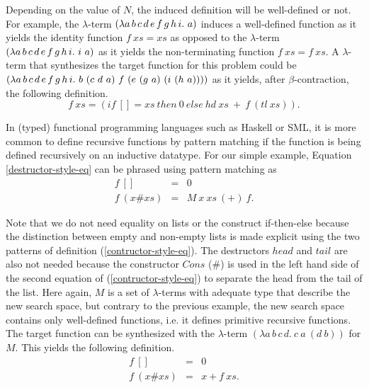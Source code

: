 Depending on the value of $N$, the induced definition will be well-defined or not. For example, the $\lambda$-term $(\lambda a\, b\, c\, \-d\,\- e\,\- f\, g\, h\, i.\ a)$ induces a well-defined function as it yields the identity function $f\ xs = xs$ as opposed to the $\lambda$-term $(\lambda a\, b\, c\, \-d\,\- e\,\- f\, g\, h\, i.\ i\ a)$ as it yields the non-terminating function $f\ xs = f\ xs$. A $\lambda$-term that synthesizes the target function for this problem could be $(\lambda a\, b\, c\, \-d\,\- e\,\- f\, g\, h\, i.\ b\ (c\ d\ a)\ f\ (e\ (g\ a)\ (i\ (h\ a))))$ as it yields, after $\beta$-contraction, the following definition.
$$
f\ xs = (if\ [] = xs\ then\ 0\ else\ hd\ xs\ +\ f\ (tl\ xs)).
$$

In (typed) functional programming languages such as Haskell or SML, it is more common to define recursive functions by pattern matching if the function is being defined recursively on an inductive datatype. For our simple example, Equation \ref{destructor-style-eq} can be phrased using pattern matching as
\begin{equation}
  \label{contructor-style-eq}
  \begin{array}{rcl}
    f\ [] & = & 0\\
    f\ (x \# xs) & = & M\ x\ xs\ (+)\ f.
  \end{array}
\end{equation}

Note that we do not need equality on lists or the construct if-then-else because the distinction between empty and non-empty lists is made explicit using the two patterns of definition (\ref{contructor-style-eq}). The destructors $head$ and $tail$ are also not needed because the constructor $Cons$ ($\#$) is used in the left hand side of the second equation of (\ref{contructor-style-eq}) to separate the head from the tail of the list. Here again, $M$ is a set of $\lambda$-terms with adequate type that describe the new search space, but contrary to the previous example, the new search space contains only well-defined functions, i.e. it defines primitive recursive functions. The target function can be synthesized with the $\lambda$-term $(\lambda a\, b\, c\, d.\ c\ a\ (d\ b))$ for $M$. This yields the following definition.
$$
\begin{array}{rcl}
  f\ [] & = &0\\
  f\ (x \# xs) & = & x + f\ xs.
\end{array}
$$

